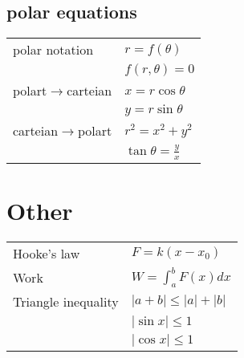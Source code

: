\documentclass[5pt]{article}
\begin{document}
\begin{multicols}{2}
\subsection{polar equations}
\begin{tabular}{ll}
    polar notation & $r=f(\theta)$\\
    & $f(r,\theta)=0$\\
    polart$\rightarrow$carteian & $x=r\cos{\theta}$\\ 
    & $y=r\sin{\theta}$\\
    carteian$\rightarrow$polart &  $r^2=x^2+y^2$\\
     & $\tan{\theta}=\frac{y}{x}$
\end{tabular}


\section{Other}
\begin{tabular}{ll}
     Hooke's law & $F=k(x-x_0)$\\
     Work & $W=\int_a^bF(x)dx$\\
     Triangle inequality & $|a+b|\le|a|+|b|$ \\
     & $|\sin{ x}|\le 1$\\
     & $|\cos{x}|\le 1$\\
\end{tabular}

\end{multicols}
\end{document}
